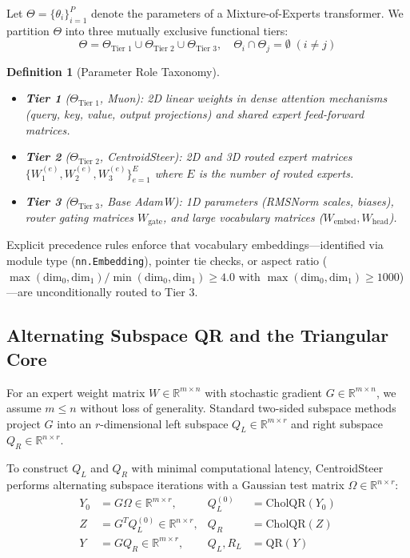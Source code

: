 \documentclass[10pt,twocolumn,letterpaper]{article}
\newtheorem{definition}{Definition}
\begin{document}
Let $\Theta = \{\theta_i\}_{i=1}^P$ denote the parameters of a Mixture-of-Experts transformer. We partition $\Theta$ into three mutually exclusive functional tiers:
\begin{equation}
    \Theta = \Theta_{\text{Tier 1}} \cup \Theta_{\text{Tier 2}} \cup \Theta_{\text{Tier 3}}, \quad \Theta_i \cap \Theta_j = \emptyset \; (i \neq j)
\end{equation}

\begin{definition}[Parameter Role Taxonomy]
\begin{itemize}
    \item \textbf{Tier 1} ($\Theta_{\text{Tier 1}}$, Muon): 2D linear weights in dense attention mechanisms (query, key, value, output projections) and shared expert feed-forward matrices.
    \item \textbf{Tier 2} ($\Theta_{\text{Tier 2}}$, CentroidSteer): 2D and 3D routed expert matrices $\{W_1^{(e)}, W_2^{(e)}, W_3^{(e)}\}_{e=1}^E$ where $E$ is the number of routed experts.
    \item \textbf{Tier 3} ($\Theta_{\text{Tier 3}}$, Base AdamW): 1D parameters (RMSNorm scales, biases), router gating matrices $W_{\text{gate}}$, and large vocabulary matrices ($W_{\text{embed}}, W_{\text{head}}$).
\end{itemize}
\end{definition}

Explicit precedence rules enforce that vocabulary embeddings---identified via module type (\texttt{nn.Embedding}), pointer tie checks, or aspect ratio ($\max(\text{dim}_0, \text{dim}_1) / \min(\text{dim}_0, \text{dim}_1) \ge 4.0$ with $\max(\text{dim}_0, \text{dim}_1) \ge 1000$)---are unconditionally routed to Tier 3.

\subsection{Alternating Subspace QR and the Triangular Core}

For an expert weight matrix $W \in \mathbb{R}^{m \times n}$ with stochastic gradient $G \in \mathbb{R}^{m \times n}$, we assume $m \le n$ without loss of generality. Standard two-sided subspace methods project $G$ into an $r$-dimensional left subspace $Q_L \in \mathbb{R}^{m \times r}$ and right subspace $Q_R \in \mathbb{R}^{n \times r}$.

To construct $Q_L$ and $Q_R$ with minimal computational latency, CentroidSteer performs alternating subspace iterations with a Gaussian test matrix $\Omega \in \mathbb{R}^{n \times r}$:
\begin{align}
    Y_0 &= G \Omega \in \mathbb{R}^{m \times r}, & Q_L^{(0)} &= \text{CholQR}(Y_0) \\
    Z &= G^T Q_L^{(0)} \in \mathbb{R}^{n \times r}, & Q_R &= \text{CholQR}(Z) \\
    Y &= G Q_R \in \mathbb{R}^{m \times r}, & Q_L, R_L &= \text{QR}(Y) \label{eq:ql_qr}
\end{align}
\end{document}
